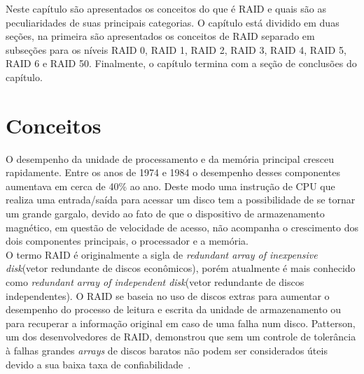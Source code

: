 Neste capítulo são apresentados os conceitos do que é RAID e quais são as peculiaridades de suas principais categorias. O capítulo está dividido em duas seções, na primeira são apresentados os conceitos de RAID separado em subseções para os níveis RAID 0, RAID 1, RAID 2, RAID 3, RAID 4, RAID 5, RAID 6 e RAID 50. Finalmente, o capítulo termina com a seção de conclusões do capítulo.

\section{Conceitos}
O desempenho da unidade de processamento e da memória principal cresceu rapidamente. Entre os anos de 1974 e 1984 o desempenho desses componentes aumentava em cerca de 40\% ao ano. Deste modo uma instrução de CPU que realiza uma entrada/saída para acessar um disco tem a possibilidade de se tornar um grande gargalo, devido ao fato de que o dispositivo de armazenamento magnético, em questão de velocidade de acesso, não acompanha o crescimento dos dois componentes principais, o processador e a memória.\\

O termo RAID é originalmente a sigla de \textit{redundant array of inexpensive disk}(vetor redundante de discos econômicos), porém atualmente é mais conhecido como \textit{redundant array of independent disk}(vetor redundante de discos independentes). O RAID se baseia no uso de discos extras para aumentar o desempenho do processo de leitura e escrita da unidade de armazenamento ou para recuperar a informação original em caso de uma falha num disco. Patterson, um dos desenvolvedores de RAID, demonstrou que sem um controle de tolerância à falhas grandes \textit{arrays} de discos baratos não podem ser considerados úteis devido a sua baixa taxa de confiabilidade~\cite{patterson88}. \\


